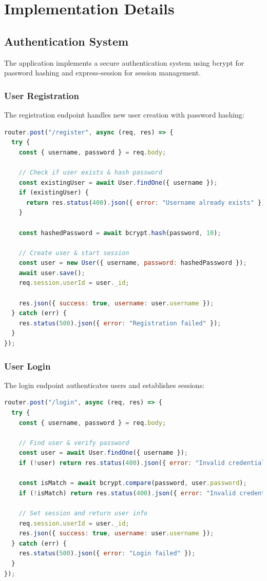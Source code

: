 \documentclass[12pt,a4paper]{article}
\begin{document}
\section{Implementation Details}

\subsection{Authentication System}
The application implements a secure authentication system using bcrypt for password hashing and express-session for session management.

\subsubsection{User Registration}
The registration endpoint handles new user creation with password hashing:
\begin{lstlisting}[language=JavaScript]
router.post("/register", async (req, res) => {
  try {
    const { username, password } = req.body;

    // Check if user exists & hash password
    const existingUser = await User.findOne({ username });
    if (existingUser) {
      return res.status(400).json({ error: "Username already exists" });
    }

    const hashedPassword = await bcrypt.hash(password, 10);

    // Create user & start session
    const user = new User({ username, password: hashedPassword });
    await user.save();
    req.session.userId = user._id;

    res.json({ success: true, username: user.username });
  } catch (err) {
    res.status(500).json({ error: "Registration failed" });
  }
});
\end{lstlisting}

\subsubsection{User Login}
The login endpoint authenticates users and establishes sessions:
\begin{lstlisting}[language=JavaScript]
router.post("/login", async (req, res) => {
  try {
    const { username, password } = req.body;

    // Find user & verify password
    const user = await User.findOne({ username });
    if (!user) return res.status(400).json({ error: "Invalid credentials" });

    const isMatch = await bcrypt.compare(password, user.password);
    if (!isMatch) return res.status(400).json({ error: "Invalid credentials" });

    // Set session and return user info
    req.session.userId = user._id;
    res.json({ success: true, username: user.username });
  } catch (err) {
    res.status(500).json({ error: "Login failed" });
  }
});
\end{lstlisting}
\end{document}
